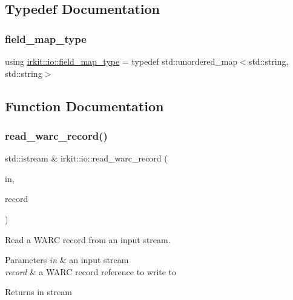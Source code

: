 \subsection{Typedef Documentation}
\mbox{\label{namespaceirkit_1_1io_a3293145f3599deb5abb1ec2ed6d2c2ae}} 
\subsubsection{\texorpdfstring{field\+\_\+map\+\_\+type}{field\_map\_type}}
{\footnotesize\ttfamily using \mbox{\hyperlink{namespaceirkit_1_1io_a3293145f3599deb5abb1ec2ed6d2c2ae}{irkit\+::io\+::field\+\_\+map\+\_\+type}} = typedef std\+::unordered\+\_\+map$<$std\+::string, std\+::string$>$}



\subsection{Function Documentation}
\mbox{\label{namespaceirkit_1_1io_a161dcbb8924839e4923f2df26ebe5ea9}} 
\subsubsection{\texorpdfstring{read\+\_\+warc\+\_\+record()}{read\_warc\_record()}}
{\footnotesize\ttfamily std\+::istream \& irkit\+::io\+::read\+\_\+warc\+\_\+record (\begin{DoxyParamCaption}\item[{std\+::istream \&}]{in,  }\item[{\mbox{\hyperlink{classirkit_1_1io_1_1warc__record}{warc\+\_\+record}} \&}]{record }\end{DoxyParamCaption})}



Read a W\+A\+RC record from an input stream. 


\begin{DoxyParams}{Parameters}
{\em in} & an input stream \\
\hline
{\em record} & a W\+A\+RC record reference to write to \\
\hline
\end{DoxyParams}
\begin{DoxyReturn}{Returns}
{\ttfamily in} stream 
\end{DoxyReturn}
